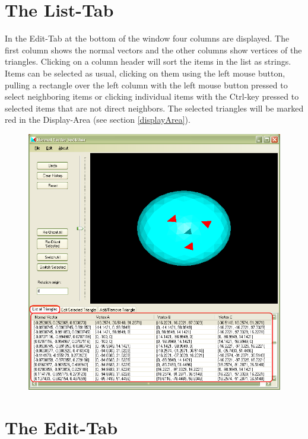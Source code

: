 \newpage
\section{The List-Tab}

In the Edit-Tab at the bottom of the window four columns are displayed. The first column shows the normal vectors and the other columns show vertices of the triangles.
Clicking on a column header will sort the items in the list as strings.
Items can be selected as usual, clicking on them using the left mouse button, pulling a rectangle over the left column with the left mouse button pressed to select neighboring items or clicking individual items with the Ctrl-key pressed to selected items that are not direct neighbors.
The selected triangles will be marked red in the Display-Area (see section \ref{displayArea}).

\begin{figure}[hb]
	\centering
	\includegraphics[width=0.9\linewidth]{window4}
\end{figure}

\newpage
\section{The Edit-Tab}

